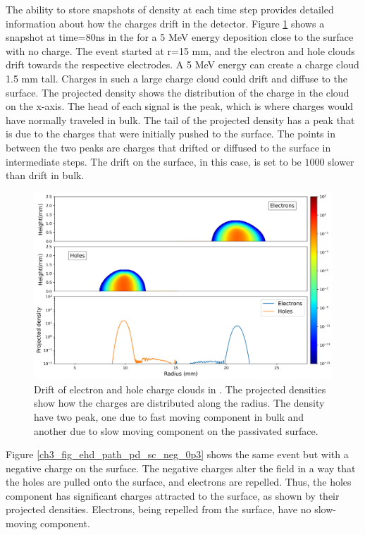The ability to store snapshots of density at each time step provides detailed information about how the charges drift in the detector. Figure \ref{ch3_fig_ehd_path_pd_sc_0} shows a snapshot at time=$80$ns in the {\ehd} for a 5 MeV energy deposition close to the surface with no charge. The event started at r=15 mm, and the electron and hole clouds drift towards the respective electrodes.  A 5 MeV energy can create a charge cloud 1.5 mm tall. Charges in such a large charge cloud could drift and diffuse to the surface. The projected density shows the distribution of the charge in the cloud on the x-axis. The head of each signal is the peak, which is where charges would have normally traveled in bulk. The tail of the projected density has a peak that is due to the charges that were initially pushed to the surface. The points in between the two peaks are charges that drifted or diffused to the surface in intermediate steps. The drift on the surface, in this case, is set to be $1000$ slower than drift in bulk. 

\begin{figure}%
    \includegraphics[trim={0cm 0 0cm 0},clip,width=0.99\linewidth]{ch3/figs/drift_path_sc=0.0.png}
    \caption{Drift of electron and hole charge clouds in {\ehd}. The projected densities show how the charges are distributed along the radius. The density have two peak, one due to fast moving component in bulk and another due to slow moving component on the passivated surface.}
    \label{ch3_fig_ehd_path_pd_sc_0}
\end{figure}

Figure \ref{ch3_fig_ehd_path_pd_sc_neg_0p3} shows the same event but with a negative charge on the surface. The negative charges alter the field in a way that the holes are pulled onto the surface, and electrons are repelled. Thus, the holes component has significant charges attracted to the surface, as shown by their projected densities. Electrons, being repelled from the surface, have no slow-moving component.


